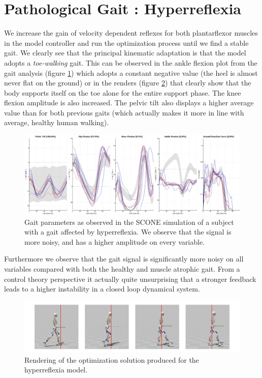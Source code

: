 \documentclass[11pt]{article}
\begin{document}
\section{Pathological Gait : Hyperreflexia}

We increase the gain of velocity dependent reflexes for both plantarflexor muscles in the model controller and run the optimization process until we find a stable gait. We clearly see that the principal kinematic adaptation is that the model adopts a \textit{toe-walking} gait. This can be observed in the ankle flexion plot  from the gait analysis (figure \ref{hr_gait}) which adopts a constant negative value (the heel is almost never flat on the ground) or in the renders (figure \ref{hr_render}) that clearly show that the body supports itself on the toe alone for the entire support phase. The knee flexion amplitude is also increased. The pelvic tilt also displays a higher average value than for both previous gaits (which actually makes it more in line with average, healthy human walking).

\begin{figure}[h!]
    \centering
    \includegraphics[width=\textwidth]{screens/hyperreflexia_gait.png}
    \caption{Gait parameters as observed in the SCONE simulation of a subject with a gait affected by hyperreflexia. We observe that the signal is more noisy, and has a higher amplitude on every variable. }
    \label{hr_gait}
\end{figure}

Furthermore we observe that the gait signal is significantly more noisy on all variables compared with both the healthy and muscle atrophic gait. From a control theory perspective it actually quite unsurprising that a stronger feedback leads to a higher instability in a closed loop dynamical system.

\begin{figure}[h!]
    \centering
    \includegraphics[width=\textwidth]{screens/toe_walk_hr.jpg}
    \caption{Rendering of the optimization solution produced for the hyperreflexia model.}
    \label{hr_render}
\end{figure}
\end{document}
